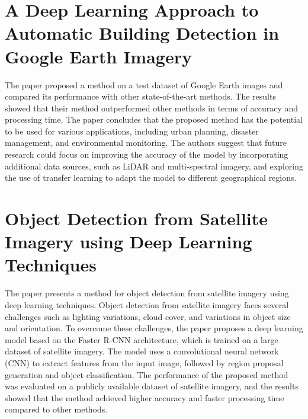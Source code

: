 \section{A Deep Learning Approach to Automatic Building Detection in Google Earth Imagery}
The paper \cite{three} proposed a method on a test dataset of Google Earth images and compared its performance with other state-of-the-art methods. The results showed that their method outperformed other methods in terms of accuracy and processing time. The paper concludes that the proposed method has the potential to be used for various applications, including urban planning, disaster management, and environmental monitoring. The authors suggest that future research could focus on improving the accuracy of the model by incorporating additional data sources, such as LiDAR and multi-spectral imagery, and exploring the use of transfer learning to adapt the model to different geographical regions.



\section{Object Detection from Satellite Imagery using Deep Learning Techniques}

The paper \cite{four} presents a method for object detection from satellite imagery using deep learning techniques. Object detection from satellite imagery faces several challenges such as lighting variations, cloud cover, and variations in object size and orientation. To overcome these challenges, the paper proposes a deep learning model based on the Faster R-CNN architecture, which is trained on a large dataset of satellite imagery. The model uses a convolutional neural network (CNN) to extract features from the input image, followed by region proposal generation and object classification. The performance of the proposed method was evaluated on a publicly available dataset of satellite imagery, and the results showed that the method achieved higher accuracy and faster processing time compared to other methods. 